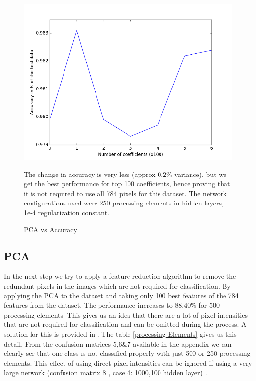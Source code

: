\documentclass[conference]{IEEEtran}
\begin{document}
\begin{figure}[h!]
\centering
\includegraphics[scale=0.45]{pca100.png}
\caption{PCA vs Accuracy}
\label{pca100}
\footnotesize{The change in accuracy is very less (approx 0.2\% variance), but we get the best performance for top 100 coefficients, hence proving that it is not required to use all 784 pixels for this dataset. The network configurations used were 250 processing elements in hidden layers, 1e-4 regularization constant.}
\end{figure}

\subsection{PCA}

In the next step we try to apply a feature reduction algorithm to remove the redundant pixels in the images which are not required for classification. By applying the PCA to the dataset and taking only 100 best features of the 784 features  from the dataset. The performance increases to 88.40\% for 500 processing elements. This gives us an idea that there are a lot of pixel intensities that are not required for classification and can be omitted during the process. A solution for this is provided in \cite{Google Nets}. The table \ref{processing Elements} gives us this detail. From the confusion matrices 5,6\&7 available in the appendix we can clearly see that one class is not classified properly with just 500 or 250 processing elements. This effect of using direct pixel intensities can be ignored if using a very large network (confusion matrix 8 , case 4: 1000,100 hidden layer) .
\end{document}
